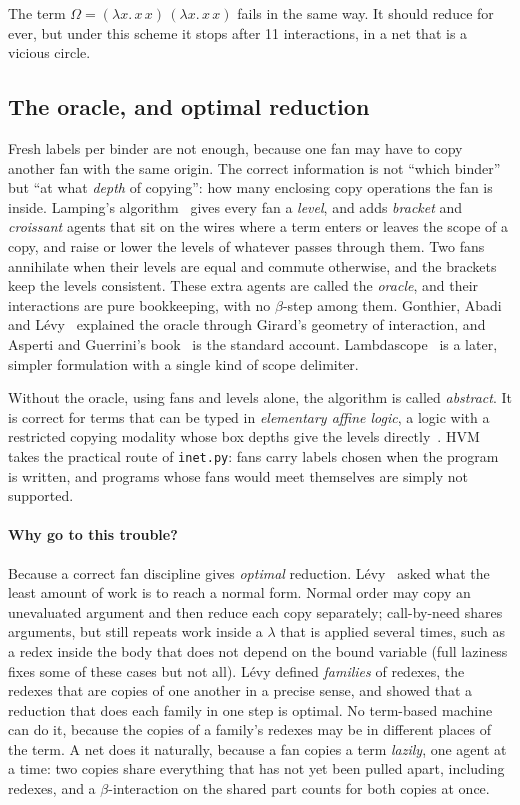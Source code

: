 \documentclass[11pt,a4paper]{article}
\theoremstyle{definition}
\theoremstyle{plain}
\begin{document}
The term $\Omega = (\lambda x.\,x\,x)\,(\lambda x.\,x\,x)$ fails in the same
way. It should reduce for ever, but under this scheme it stops after 11
interactions, in a net that is a vicious circle.

\subsection{The oracle, and optimal reduction}\label{sec:oracle}

Fresh labels per binder are not enough, because one fan may have to copy
another fan with the same origin. The correct information is not ``which
binder'' but ``at what \emph{depth} of copying'': how many enclosing copy
operations the fan is inside. Lamping's algorithm~\cite{lamping90} gives every
fan a \emph{level}, and adds \emph{bracket} and \emph{croissant} agents that
sit on the wires where a term enters or leaves the scope of a copy, and raise
or lower the levels of whatever passes through them. Two fans annihilate when
their levels are equal and commute otherwise, and the brackets keep the
levels consistent. These extra agents are called the \emph{oracle}, and their
interactions are pure bookkeeping, with no $\beta$-step among them.
Gonthier, Abadi and Lévy~\cite{gal92} explained the oracle through Girard's
geometry of interaction, and Asperti and Guerrini's book~\cite{ag98} is the
standard account. Lambdascope~\cite{lambdascope} is a later, simpler
formulation with a single kind of scope delimiter.

Without the oracle, using fans and levels alone, the algorithm is called
\emph{abstract}. It is correct for terms that can be typed in
\emph{elementary affine logic}, a logic with a restricted copying modality
whose box depths give the levels directly~\cite{coppolamartini06,bcd11}.
HVM~\cite{hvm} takes the practical route of \texttt{inet.py}: fans carry
labels chosen when the program is written, and programs whose fans would meet
themselves are simply not supported.

\paragraph{Why go to this trouble?} Because a correct fan discipline gives
\emph{optimal} reduction. Lévy~\cite{levy80} asked what the least amount of
work is to reach a normal form. Normal order may copy an unevaluated argument
and then reduce each copy separately; call-by-need shares arguments, but
still repeats work inside a $\lambda$ that is applied several times, such as
a redex inside the body that does not depend on the bound variable (full
laziness fixes some of these cases but not all). Lévy defined \emph{families}
of redexes, the redexes that are copies of one another in a precise sense,
and showed that a reduction that does each family in one step is optimal.
No term-based machine can do it, because the copies of a family's redexes
may be in different places of the term. A net does it naturally, because a
fan copies a term \emph{lazily}, one agent at a time: two copies share
everything that has not yet been pulled apart, including redexes, and a
$\beta$-interaction on the shared part counts for both copies at once.
\end{document}
